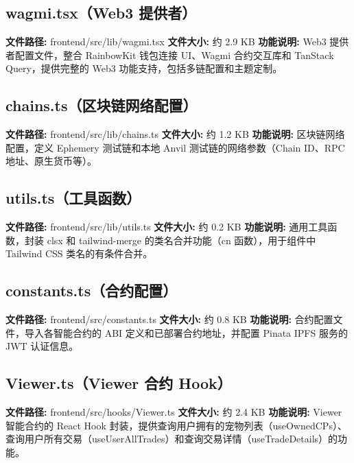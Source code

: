 \documentclass[code]{mancls}
\begin{document}
\pagebreak

\subsection{wagmi.tsx（Web3 提供者）}
\textbf{文件路径:} frontend/src/lib/wagmi.tsx
\textbf{文件大小:} 约 2.9 KB
\textbf{功能说明:} Web3 提供者配置文件，整合 RainbowKit 钱包连接 UI、Wagmi 合约交互库和 TanStack Query，提供完整的 Web3 功能支持，包括多链配置和主题定制。



\pagebreak

\subsection{chains.ts（区块链网络配置）}
\textbf{文件路径:} frontend/src/lib/chains.ts
\textbf{文件大小:} 约 1.2 KB
\textbf{功能说明:} 区块链网络配置，定义 Ephemery 测试链和本地 Anvil 测试链的网络参数（Chain ID、RPC 地址、原生货币等）。



\pagebreak

\subsection{utils.ts（工具函数）}
\textbf{文件路径:} frontend/src/lib/utils.ts
\textbf{文件大小:} 约 0.2 KB
\textbf{功能说明:} 通用工具函数，封装 clsx 和 tailwind-merge 的类名合并功能（cn 函数），用于组件中 Tailwind CSS 类名的有条件合并。



\pagebreak

\subsection{constants.ts（合约配置）}
\textbf{文件路径:} frontend/src/constants.ts
\textbf{文件大小:} 约 0.8 KB
\textbf{功能说明:} 合约配置文件，导入各智能合约的 ABI 定义和已部署合约地址，并配置 Pinata IPFS 服务的 JWT 认证信息。



\pagebreak

\subsection{Viewer.ts（Viewer 合约 Hook）}
\textbf{文件路径:} frontend/src/hooks/Viewer.ts
\textbf{文件大小:} 约 2.4 KB
\textbf{功能说明:} Viewer 智能合约的 React Hook 封装，提供查询用户拥有的宠物列表（useOwnedCPs）、查询用户所有交易（useUserAllTrades）和查询交易详情（useTradeDetails）的功能。
\end{document}
